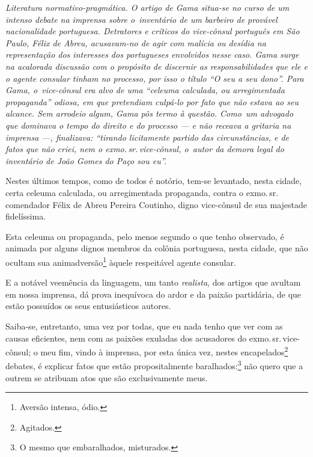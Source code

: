 
\begin{resumo}
\emph{Literatura normativo-pragmática. O artigo de Gama situa-se no
curso de um intenso debate na imprensa sobre o~inventário de um barbeiro
de provável nacionalidade portuguesa. Detratores e críticos do
vice-cônsul português em São Paulo, Félix de Abreu, acusavam-no de agir
com malícia ou desídia na representação dos interesses dos portugueses
envolvidos nesse caso. Gama surge na acalorada discussão com o propósito
de discernir as responsabilidades que ele e o agente consular tinham no
processo, por isso o título ``O seu a seu dono''. Para Gama, o~vice-cônsul era alvo de uma ``celeuma calculada, ou arregimentada
propaganda'' odiosa, em que pretendiam culpá-lo por fato que não estava
ao seu alcance. Sem arrodeio algum, Gama pôs termo à questão. Como~um
advogado que dominava o tempo do direito e do processo --- e não receava
a gritaria na imprensa ---, finalizava: ``tirando licitamente partido das
circunstâncias, e de fatos que não criei, nem o exmo.\,sr.\,vice-cônsul, o~autor da demora legal do inventário de João Gomes do Paço sou eu''. }
\end{resumo}

Nestes últimos tempos, como de todos é notório, tem-se levantado, nesta
cidade, certa celeuma calculada, ou arregimentada propaganda, contra o
exmo.\,sr.\,comendador Félix de Abreu Pereira Coutinho, digno vice-cônsul
de sua majestade fidelíssima.

Esta celeuma ou propaganda, pelo menos segundo o que tenho observado, é
animada por alguns dignos membros da colônia portuguesa, nesta cidade,
que não ocultam sua animadversão\footnote{Aversão intensa, ódio.}
àquele respeitável agente consular.

E a notável veemência da linguagem, um tanto \emph{realista}, dos
artigos que avultam em nossa imprensa, dá prova inequívoca do ardor e da
paixão partidária, de que estão possuídos os seus entusiásticos autores.

Saiba-se, entretanto, uma vez por todas, que eu nada tenho que ver com
as causas eficientes, nem com as paixões exuladas dos acusadores do
exmo.\,sr.\,vice-cônsul; o meu fim, vindo à imprensa, por esta única vez,
nestes encapelados\footnote{Agitados.} debates, é explicar fatos que
estão propositalmente baralhados:\footnote{O mesmo que embaralhados,
  misturados.} não quero que a outrem se atribuam atos que são
exclusivamente meus.

